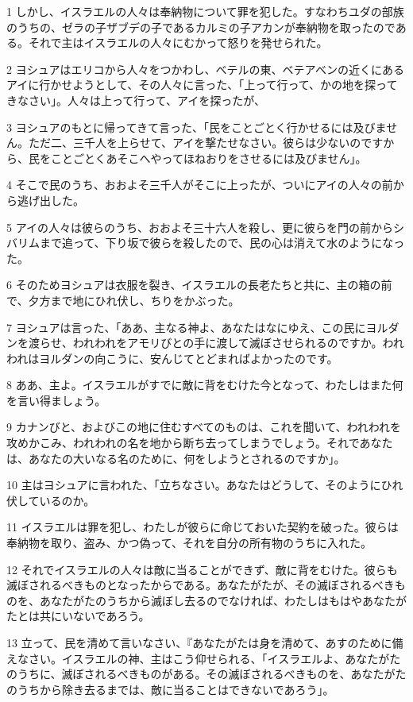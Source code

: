 \par 1 しかし、イスラエルの人々は奉納物について罪を犯した。すなわちユダの部族のうちの、ゼラの子ザブデの子であるカルミの子アカンが奉納物を取ったのである。それで主はイスラエルの人々にむかって怒りを発せられた。
\par 2 ヨシュアはエリコから人々をつかわし、ベテルの東、ベテアベンの近くにあるアイに行かせようとして、その人々に言った、「上って行って、かの地を探ってきなさい」。人々は上って行って、アイを探ったが、
\par 3 ヨシュアのもとに帰ってきて言った、「民をことごとく行かせるには及びません。ただ二、三千人を上らせて、アイを撃たせなさい。彼らは少ないのですから、民をことごとくあそこへやってほねおりをさせるには及びません」。
\par 4 そこで民のうち、おおよそ三千人がそこに上ったが、ついにアイの人々の前から逃げ出した。
\par 5 アイの人々は彼らのうち、おおよそ三十六人を殺し、更に彼らを門の前からシバリムまで追って、下り坂で彼らを殺したので、民の心は消えて水のようになった。
\par 6 そのためヨシュアは衣服を裂き、イスラエルの長老たちと共に、主の箱の前で、夕方まで地にひれ伏し、ちりをかぶった。
\par 7 ヨシュアは言った、「ああ、主なる神よ、あなたはなにゆえ、この民にヨルダンを渡らせ、われわれをアモリびとの手に渡して滅ぼさせられるのですか。われわれはヨルダンの向こうに、安んじてとどまればよかったのです。
\par 8 ああ、主よ。イスラエルがすでに敵に背をむけた今となって、わたしはまた何を言い得ましょう。
\par 9 カナンびと、およびこの地に住むすべてのものは、これを聞いて、われわれを攻めかこみ、われわれの名を地から断ち去ってしまうでしょう。それであなたは、あなたの大いなる名のために、何をしようとされるのですか」。
\par 10 主はヨシュアに言われた、「立ちなさい。あなたはどうして、そのようにひれ伏しているのか。
\par 11 イスラエルは罪を犯し、わたしが彼らに命じておいた契約を破った。彼らは奉納物を取り、盗み、かつ偽って、それを自分の所有物のうちに入れた。
\par 12 それでイスラエルの人々は敵に当ることができず、敵に背をむけた。彼らも滅ぼされるべきものとなったからである。あなたがたが、その滅ぼされるべきものを、あなたがたのうちから滅ぼし去るのでなければ、わたしはもはやあなたがたとは共にいないであろう。
\par 13 立って、民を清めて言いなさい、『あなたがたは身を清めて、あすのために備えなさい。イスラエルの神、主はこう仰せられる、「イスラエルよ、あなたがたのうちに、滅ぼされるべきものがある。その滅ぼされるべきものを、あなたがたのうちから除き去るまでは、敵に当ることはできないであろう」。
